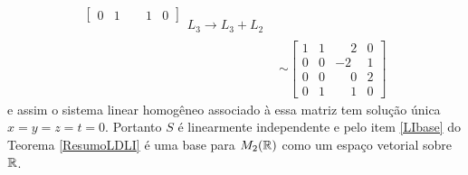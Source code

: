 \begin{exemplos}
\begin{solucao}
\begin{enumerate}
\begin{align*}
\begin{bmatrix}
            0 & 1 & \phantom{-} 1 & 0
          \end{bmatrix}
          \begin{array}{l}
            \phantom{x}\\\phantom{x}\\L_3 \to L_3 + L_2
          \end{array}\\&\sim
          \begin{bmatrix}
            1 & 1 & \phantom{-} 2 & 0\\
            0 & 0 & -2 & 1\\
            0 & 0 & \phantom{-} 0 & 2\\
            0 & 1 & \phantom{-} 1 & 0
          \end{bmatrix}
        \end{align*}
        e assim o sistema linear homogêneo associado à essa matriz tem solução única $x = y = z = t = 0$. Portanto $S$ é linearmente independente e pelo item \ref{LIbase} do Teorema \ref{ResumoLDLI} é uma base para $M_2(\mathbb{R})$ como um espaço vetorial sobre $\mathbb{R}$.
    \end{enumerate}
  \end{solucao}
\end{exemplos}
